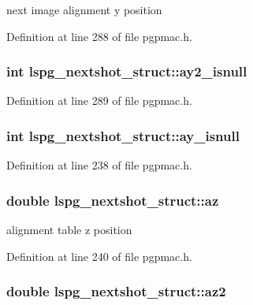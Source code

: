 next image alignment y position 



Definition at line 288 of file pgpmac.\-h.

\hypertarget{structlspg__nextshot__struct_ad0f50ec6339296d3d39c8d95131ab6b5}{
\subsubsection[{ay2\-\_\-isnull}]{\setlength{\rightskip}{0pt plus 5cm}int lspg\-\_\-nextshot\-\_\-struct\-::ay2\-\_\-isnull}}\label{structlspg__nextshot__struct_ad0f50ec6339296d3d39c8d95131ab6b5}


Definition at line 289 of file pgpmac.\-h.

\hypertarget{structlspg__nextshot__struct_a9da91abc8090532ed98ccd47a3bab775}{
\subsubsection[{ay\-\_\-isnull}]{\setlength{\rightskip}{0pt plus 5cm}int lspg\-\_\-nextshot\-\_\-struct\-::ay\-\_\-isnull}}\label{structlspg__nextshot__struct_a9da91abc8090532ed98ccd47a3bab775}


Definition at line 238 of file pgpmac.\-h.

\hypertarget{structlspg__nextshot__struct_a66e678866ce79f6398b66d033ae45a17}{
\subsubsection[{az}]{\setlength{\rightskip}{0pt plus 5cm}double lspg\-\_\-nextshot\-\_\-struct\-::az}}\label{structlspg__nextshot__struct_a66e678866ce79f6398b66d033ae45a17}


alignment table z position 



Definition at line 240 of file pgpmac.\-h.

\hypertarget{structlspg__nextshot__struct_a94698a030fd5b2abf1f10a2ad33476a4}{
\subsubsection[{az2}]{\setlength{\rightskip}{0pt plus 5cm}double lspg\-\_\-nextshot\-\_\-struct\-::az2}}\label{structlspg__nextshot__struct_a94698a030fd5b2abf1f10a2ad33476a4}


